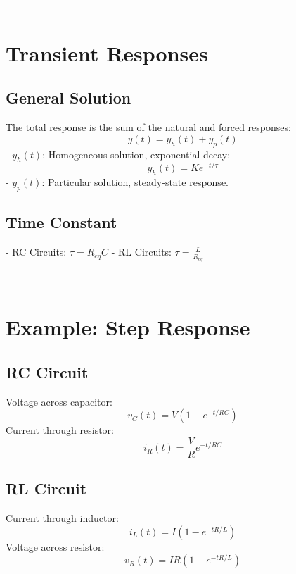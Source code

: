 \documentclass[9pt]{article}
\begin{document}
\begin{multicols}{2}
---

\section{Transient Responses}

\subsection{General Solution}
The total response is the sum of the natural and forced responses:
\[
y(t) = y_h(t) + y_p(t)
\]
- \(y_h(t)\): Homogeneous solution, exponential decay:
\[
y_h(t) = Ke^{-t/\tau}
\]
- \(y_p(t)\): Particular solution, steady-state response.

\subsection{Time Constant}
- RC Circuits: \( \tau = R_{eq}C \)
- RL Circuits: \( \tau = \frac{L}{R_{eq}} \)

---

\section{Example: Step Response}

\subsection{RC Circuit}
Voltage across capacitor:
\[
v_C(t) = V(1 - e^{-t/RC})
\]
Current through resistor:
\[
i_R(t) = \frac{V}{R}e^{-t/RC}
\]

\subsection{RL Circuit}
Current through inductor:
\[
i_L(t) = I(1 - e^{-tR/L})
\]
Voltage across resistor:
\[
v_R(t) = IR(1 - e^{-tR/L})
\]

\end{multicols}
\end{document}
